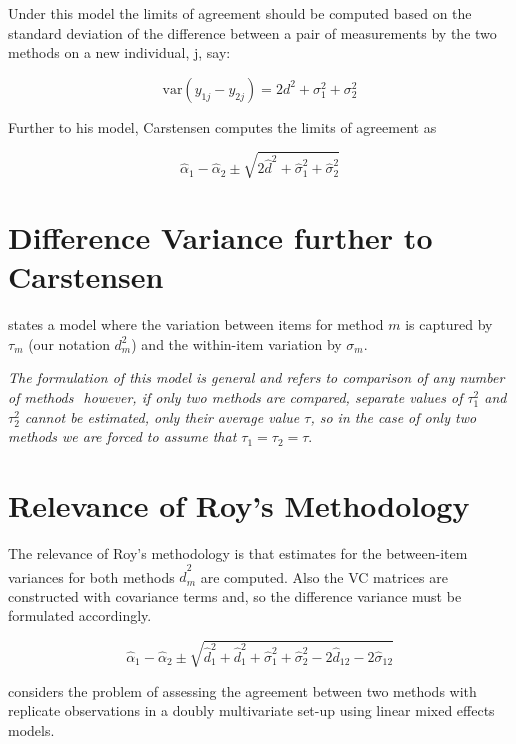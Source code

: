 \documentclass[12pt, a4paper]{report}
\theoremstyle{plain}
\theoremstyle{definition}
\theoremstyle{remark}
\begin{document}
Under this model the limits of agreement should be computed based
on the standard deviation of the difference between a pair of
measurements by the two methods on a new individual, j, say:

\[ \mbox{var}(y_{1j} - y_{2j}) = 2d^2 + \sigma^2_1 + \sigma^2_2  \]

Further to his model, Carstensen computes the limits of agreement
as

\[
\hat{\alpha}_1 - \hat{\alpha}_2 \pm \sqrt{2 \hat{d}^2 + 	\hat{\sigma}^2_1 + \hat{\sigma}^2_2}
\]

	\section{Difference Variance further to Carstensen}
	
	\citet{BXC2008} states a model where the variation between items
	for method $m$ is captured by $\tau_m$ (our notation $d^2_m$) and the within-item
	variation by $\sigma_m$.
	
	\emph{The formulation of this model is general and refers to comparison
		of any number of methods  however, if only two methods are
		compared, separate values of $\tau^2_1$ and $\tau^2_2$ cannot be
		estimated, only their average value $\tau$, so in the case of only
		two methods we are forced to assume that $\tau_1 = \tau_2 = \tau$}\citep{BXC2008}.

	\section{Relevance of Roy's Methodology}

The relevance of Roy's methodology is that estimates for the between-item variances for both methods $\hat{d}^2_m$ are computed. Also the VC matrices are constructed with covariance
terms and, so the difference variance must be formulated accordingly.


\[
\hat{\alpha}_1 - \hat{\alpha}_2 \pm \sqrt{ \hat{d}^2_1  +
	\hat{d}^2_1 + \hat{\sigma}^2_1 + \hat{\sigma}^2_2 - 2 \hat{d}_{12}
	- 2 \hat{\sigma}_12}
\]




\citet{ARoy2009} considers the problem of assessing the agreement
between two methods with replicate observations in a doubly
multivariate set-up using linear mixed effects models.
\end{document}

